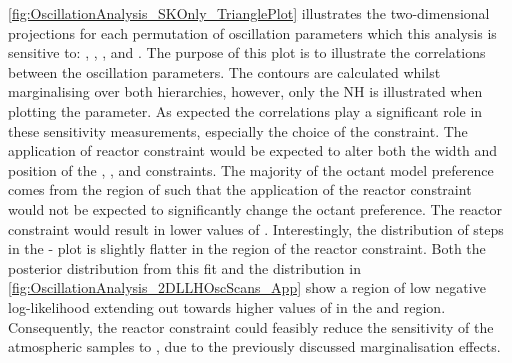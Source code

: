 \autoref{fig:OscillationAnalysis_SKOnly_TrianglePlot} illustrates the two-dimensional projections for each permutation of oscillation parameters which this analysis is sensitive to: , , , and . The purpose of this plot is to illustrate the correlations between the oscillation parameters. The contours are calculated whilst marginalising over both hierarchies, however, only the NH is illustrated when plotting the  parameter. As expected the correlations play a significant role in these sensitivity measurements, especially the choice of the  constraint. The application of reactor constraint would be expected to alter both the width and position of the , , and  constraints. The majority of the octant model preference comes from the region of  such that the application of the reactor constraint would not be expected to significantly change the octant preference. The reactor constraint would result in lower values of . Interestingly, the distribution of steps in the - plot is slightly flatter in the region of the reactor constraint. Both the posterior distribution from this fit and the distribution in \autoref{fig:OscillationAnalysis_2DLLHOscScans_App} show a region of low negative log-likelihood extending out towards higher values of  in the  and  region. Consequently, the reactor constraint could feasibly reduce the sensitivity of the atmospheric samples to , due to the previously discussed marginalisation effects. 

